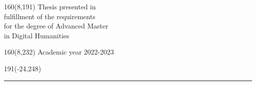 \documentclass[12pt,a4paper,oneside]{book}
\begin{document}
%
\begin{textblock}{160}(8,191)
\textblockcolour{}
\vspace{-\parskip}
\flushright
Thesis presented in\\[4.5pt]
fulfillment of the requirements\\[4.5pt]
for the degree of Advanced Master\\[4.5pt]
in Digital Humanities\\
\end{textblock}
%
\begin{textblock}{160}(8,232)
\textblockcolour{}
\vspace{-\parskip}
\flushright
Academic year 2022-2023
\end{textblock}
%
\begin{textblock}{191}(-24,248)
{\color{blueline}\rule{550pt}{5.5pt}}
\end{textblock}
%
\vfill
\newpage
\end{document}
